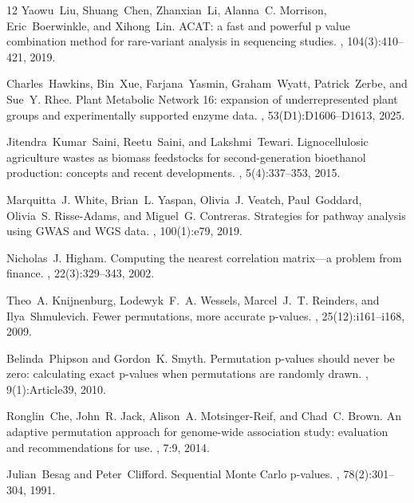 \documentclass[unnumsec,webpdf,contemporary,large]{oup-authoring-template}%
\theoremstyle{thmstyleone}%
\theoremstyle{thmstyletwo}%
\theoremstyle{thmstylethree}%
\begin{document}
\begin{thebibliography}{12}
Yaowu~Liu, Shuang~Chen, Zhanxian~Li, Alanna~C. Morrison, Eric~Boerwinkle, and Xihong~Lin.
\newblock ACAT: a fast and powerful p value combination method for rare-variant analysis in sequencing studies.
, 104(3):410--421, 2019.

Charles~Hawkins, Bin~Xue, Farjana~Yasmin, Graham~Wyatt, Patrick~Zerbe, and Sue~Y. Rhee.
\newblock Plant Metabolic Network 16: expansion of underrepresented plant groups and experimentally supported enzyme data.
, 53(D1):D1606--D1613, 2025.

Jitendra~Kumar~Saini, Reetu~Saini, and Lakshmi~Tewari.
\newblock Lignocellulosic agriculture wastes as biomass feedstocks for second-generation bioethanol production: concepts and recent developments.
, 5(4):337--353, 2015.

Marquitta~J. White, Brian~L. Yaspan, Olivia~J. Veatch, Paul~Goddard, Olivia~S. Risse-Adams, and Miguel~G. Contreras.
\newblock Strategies for pathway analysis using GWAS and WGS data.
, 100(1):e79, 2019.

Nicholas~J. Higham.
\newblock Computing the nearest correlation matrix---a problem from finance.
, 22(3):329--343, 2002.

Theo~A. Knijnenburg, Lodewyk~F.~A. Wessels, Marcel~J.~T. Reinders, and Ilya~Shmulevich.
\newblock Fewer permutations, more accurate p-values.
, 25(12):i161--i168, 2009.

Belinda~Phipson and Gordon~K. Smyth.
\newblock Permutation p-values should never be zero: calculating exact p-values when permutations are randomly drawn.
, 9(1):Article39, 2010.

Ronglin~Che, John~R. Jack, Alison~A. Motsinger-Reif, and Chad~C. Brown.
\newblock An adaptive permutation approach for genome-wide association study: evaluation and recommendations for use.
, 7:9, 2014.

Julian~Besag and Peter~Clifford.
\newblock Sequential Monte Carlo p-values.
, 78(2):301--304, 1991.


\end{thebibliography}
\end{document}
